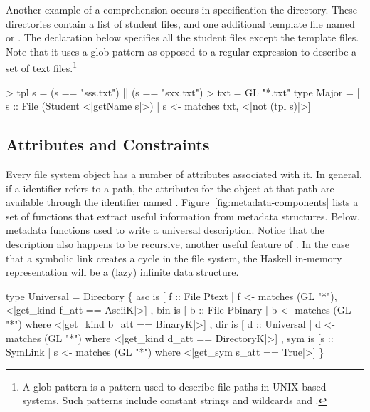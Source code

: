 Another example of a comprehension occurs in specification the  
directory.  These directories contain a list of student files, and one additional
template file named  or .  The declaration below
specifies all the student files except the template files.  Note that it uses
a glob pattern as opposed to a regular expression
to describe a set of text files.\footnote{A glob pattern
is a pattern used to describe file paths in UNIX-based systems.  Such patterns include
constant strings and wildcards \cd{*} and .} 
\begin{code}
> tpl s = (s == "sss.txt") || (s == "sxx.txt")
> txt = GL "*.txt"
\mbox{}
type Major =   
  [ s :: File (Student <|getName s|>) 
  | s <- matches txt, <|not (tpl s)|>]
\end{code}

\subsection{Attributes and Constraints}
\label{sec:constraints}

Every file system object has a number of attributes associated with it.  In general,
if a \forest{} identifier  refers to a path, the attributes for the object at that
path are available through the identifier named . Figure~\ref{fig:metadata-components}
lists a set of functions that extract useful information from metadata structures.
Below, metadata functions used to write a universal description.
Notice that the description also happens to be recursive, another useful feature of
\forest{}.  In the case that a symbolic link creates a cycle in the file system, the Haskell
in-memory representation will be a (lazy) infinite data structure. 
\begin{code}
type Universal = Directory 
  \{ asc is [ f :: File Ptext   
           | f <- matches (GL "*"), 
            <|get_kind f_att == AsciiK|>]
  , bin is [ b :: File Pbinary
           | b <- matches (GL "*") 
           where <|get_kind b_att == BinaryK|>]
  , dir is [ d :: Universal  
           | d <- matches (GL "*") 
           where <|get_kind d_att == DirectoryK|>]
  , sym is [s :: SymLink      
           | s <- matches (GL "*") 
           where <|get_sym s_att == True|>]
  \}
\end{code}

